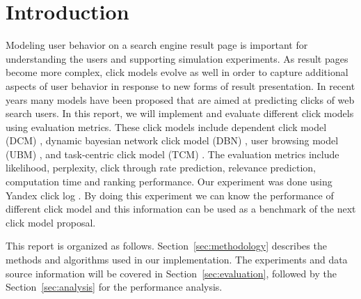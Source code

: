 \section{Introduction}
Modeling user behavior on a search engine result page is important for understanding the users and supporting simulation experiments.
As result pages become more complex, click models evolve as well in order to capture additional aspects of user behavior in response to new forms of result presentation.
In recent years many models have been proposed that are aimed at predicting clicks of web search users. 
In this report, we will implement and evaluate different click models using evaluation metrics.
These click models include dependent click model (DCM) \cite{Guo2009}, dynamic bayesian network click model (DBN) \cite{Chapelle2009}, user browsing model (UBM) \cite{Dupret2008}, and task-centric click model (TCM) \cite{Zhang2011}.
The evaluation metrics include likelihood, perplexity, click through rate prediction, relevance prediction, computation time and ranking performance.
Our experiment was done using Yandex click log \cite{yandex}.
By doing this experiment we can know the performance of different click model and this information can be used as a benchmark of the next click model proposal.

This report is organized as follows.
Section~\ref{sec:methodology} describes the methods and algorithms used in our implementation.
The experiments and data source information will be covered in Section~\ref{sec:evaluation}, followed by the Section~\ref{sec:analysis} for the performance analysis.